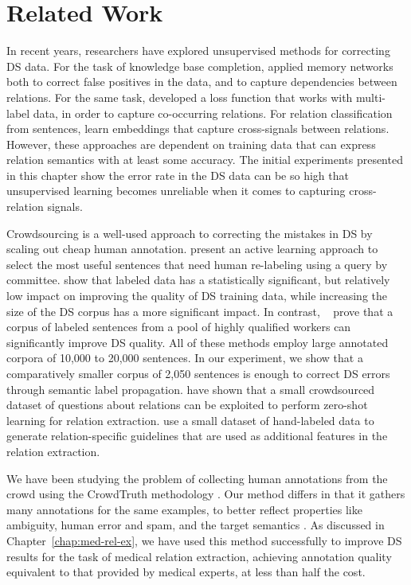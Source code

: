 \section{Related Work}

In recent years, researchers have explored unsupervised methods for correcting DS data. For the task of knowledge base completion, \cite{DBLP:conf/ijcai/FengGQLL17} applied memory networks both to correct false positives in the data, and to capture dependencies between relations. For the same task, \cite{Jiang2016RelationEW} developed a loss function that works with multi-label data, in order to capture co-occurring relations. For relation classification from sentences, \cite{DBLP:conf/acl/SantosXZ15} learn embeddings that capture cross-signals between relations. However, these approaches are dependent on training data that can express relation semantics with at least some accuracy. The initial experiments presented in this chapter show the error rate in the DS data can be so high that unsupervised learning becomes unreliable when it comes to capturing cross-relation signals.

Crowdsourcing is a well-used approach to correcting the mistakes in DS by scaling out cheap human annotation. \citet{angeli2014combining} present an active learning approach to select the most useful sentences that need human re-labeling using a query by committee. \citet{zhang2012big} show that labeled data has a statistically significant, but relatively low impact on improving the quality of DS training data, while increasing the size of the DS corpus has a more significant impact. In contrast, ~\citet{liu2016effective} prove that a corpus of labeled sentences from a pool of highly qualified workers can significantly improve DS quality. All of these methods employ large annotated corpora of 10,000 to 20,000 sentences. In our experiment, we show that a comparatively smaller corpus of 2,050 sentences is enough to correct DS errors through semantic label propagation. \citet{levy2017zero} have shown that a small crowdsourced dataset of questions about relations can be exploited to perform zero-shot learning for relation extraction. \citet{pershina2014infusion} use a small dataset of hand-labeled data to generate relation-specific guidelines that are used as additional features in the relation extraction.

We have been studying the problem of collecting human annotations from the crowd using the CrowdTruth methodology \cite{aroyo2013crowd}.  Our method differs in that it gathers many annotations for the same examples, to better reflect properties like ambiguity, human error and spam, and the target semantics \cite{aroyo2014threesides}. As discussed in Chapter~\ref{chap:med-rel-ex}, we have used this method successfully to improve DS results for the task of medical relation extraction, achieving annotation quality equivalent to that provided by medical experts, at less than half the cost.

